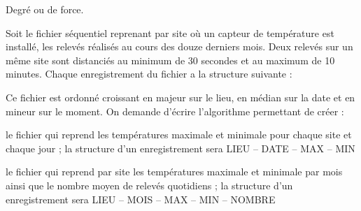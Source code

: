\begin{Exercice}{Degré ou de force.}

	Soit le fichier séquentiel  reprenant par site où un capteur de
	température est installé, les relevés réalisés au cours des douze
	derniers mois. Deux relevés sur un même site sont distanciés au minimum
	de 30 secondes et au maximum de 10 minutes. Chaque enregistrement du
	fichier a la structure  suivante :

	
	Ce fichier est ordonné croissant en majeur sur le lieu, en médian sur la
	date et en mineur sur le moment. On demande d’écrire l’algorithme
	permettant de créer :

	\begin{liste}
		\item 
			le fichier  qui reprend les températures maximale et minimale
			pour chaque site et chaque jour ; la structure d’un enregistrement sera
			LIEU – DATE – MAX – MIN
		\item 
			le fichier  qui reprend par site les températures maximale et
			minimale par mois ainsi que le nombre moyen de relevés quotidiens ; la
			structure d’un enregistrement sera LIEU – MOIS – MAX – MIN – NOMBRE
	\end{liste}
\end{Exercice}

